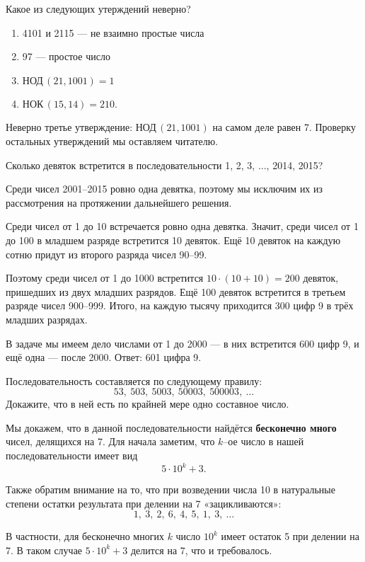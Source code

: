 \begin{itemize}

	\itA Какое из следующих утерждений неверно?
	
	\begin{enumerate}[label=\arabic*)]
		\item 4101 и 2115 — не взаимно простые числа\scolon
		\item 97 — простое число\scolon
		\item $\text{НОД}\,(21,1001)=1$\scolon
		\item $\text{НОК}\,(15,14)=210$.
	\end{enumerate}
	
	\itr Неверно третье утверждение: $\text{НОД}\,(21,1001)$ на самом \linebreak деле равен 7. Проверку остальных утверждений мы оставляем читателю.
	
	\itB Сколько девяток встретится в последовательности 1, 2, 3, $\ldots$, 2014, 2015?
	
	\itr Среди чисел 2001–2015 ровно одна девятка, поэтому мы исключим их из рассмотрения на протяжении дальнейшего решения.
	
	Среди чисел от 1 до 10 встречается ровно одна девятка. Значит, среди чисел от 1 до 100 в младшем разряде встретится 10 девяток. Ещё 10 девяток на каждую сотню придут из второго разряда чисел 90–99.
	
	Поэтому среди чисел от 1 до 1000 встретится $10 \cdot (10+10) = 200$ девяток, пришедших из двух младших разрядов. Ещё 100 девяток встретится в третьем разряде чисел 900–999. Итого, на каждую тысячу приходится 300 цифр 9 в трёх младших разрядах.
	
	В задаче мы имеем дело числами от 1 до 2000 — в них встретится 600 цифр 9, и ещё одна — после 2000. Ответ: 601 цифра 9.
	
	\itC Последовательность составляется по следующему правилу:
	$$53,\ 503,\ 5003,\ 50003,\ 500003,\ \ldots$$
	Докажите, что в ней есть по крайней мере одно составное число.
	
	\itr Мы докажем, что в данной последовательности найдётся {\bfseries бесконечно много} чисел, делящихся на 7. Для начала заметим, что $k$--ое число в нашей последовательности имеет вид
	$$5\cdot 10^k + 3.$$
	
	Также обратим внимание на то, что при возведении числа 10 в натуральные степени остатки результата при делении на 7 «зацикливаются»:
	$$1,\ 3,\ 2,\ 6,\ 4,\ 5,\ 1,\ 3,\ \ldots$$
	
	В частности, для бесконечно многих $k$ число $10^k$ имеет остаток 5 \linebreak при делении на 7. В таком случае $5 \cdot 10^k + 3$ делится на 7, что и требовалось.

\end{itemize}

